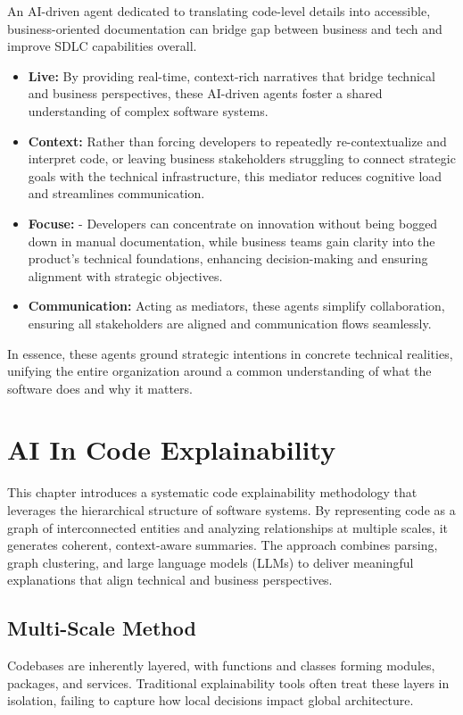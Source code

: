 \documentclass[12pt,twocolumn]{article}
\begin{document}
An AI-driven agent dedicated to translating code-level details into accessible, business-oriented documentation can bridge 
gap between business and tech and improve SDLC capabilities overall.

\begin{itemize}
  \item \textbf{Live:} 
  By providing real-time, context-rich narratives that bridge technical and business perspectives, these AI-driven agents 
foster a shared understanding of complex software systems. 

  \item \textbf{Context:} 
  Rather than forcing developers to repeatedly re-contextualize and interpret code, or leaving business stakeholders struggling to connect strategic goals with the technical infrastructure, 
this mediator reduces cognitive load and streamlines communication. 

  \item \textbf{Focuse:} 
- Developers can concentrate on innovation without being bogged down in manual documentation, while business teams gain clarity into the product’s technical foundations, 
enhancing decision-making and ensuring alignment with strategic objectives. 

  \item \textbf{Communication:} 
  Acting as mediators, these agents simplify collaboration, ensuring all stakeholders are aligned and communication flows seamlessly.
\end{itemize}

In essence, these agents ground strategic intentions in concrete technical realities, unifying the entire organization around a common understanding of what the 
software does and why it matters.


\section{AI In Code Explainability}

This chapter introduces a systematic code explainability methodology that leverages 
the hierarchical structure of software systems. By representing code as a graph of 
interconnected entities and analyzing relationships at multiple scales, it generates coherent, 
context-aware summaries. The approach combines parsing, graph clustering, and large language models (LLMs) 
to deliver meaningful explanations that align technical and business perspectives.


\subsection{Multi-Scale Method}
Codebases are inherently layered, with functions and classes forming modules, packages, and services. 
Traditional explainability tools often treat these layers in isolation, failing to capture how local decisions 
impact global architecture.
\end{document}
